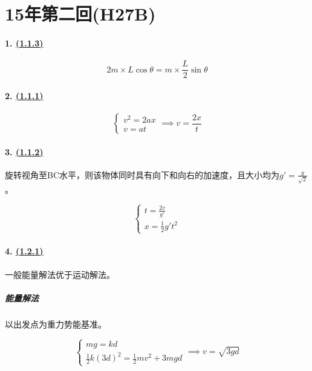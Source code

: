 
\section{15年第二回(H27B)}

\paragraph{1. \hyperref[subsec:1.1.3]{(1.1.3)}}

\begin{equation*}
    2m\times L\cos\theta=m\times\frac{L}{2}\sin\theta
\end{equation*}

\paragraph{2. \hyperref[subsec:1.1.1]{(1.1.1)}}

\begin{equation*}
    \begin{cases}
        v^2=2ax\\
        v=at
    \end{cases}\implies
    v=\frac{2x}{t}
\end{equation*}

\paragraph{3. \hyperref[subsec:1.1.2]{(1.1.2)}} 旋转视角至BC水平，则该物体同时具有向下和向右的加速度，且大小均为$g'=\frac{g}{\sqrt{2}}$。

\begin{equation*}
    \begin{cases}
        t=\frac{2v}{g'}\\
        x=\frac12g't^2
    \end{cases}
\end{equation*}

\paragraph{4. \hyperref[subsec:1.2.1]{(1.2.1)}} 一般能量解法优于运动解法。

\subparagraph{能量解法} 以出发点为重力势能基准。

\begin{equation*}
    \begin{cases}
        mg=kd\\
        \frac12k(3d)^2=\frac12mv^2+3mgd
    \end{cases}\implies
    v=\sqrt{3gd}
\end{equation*}

